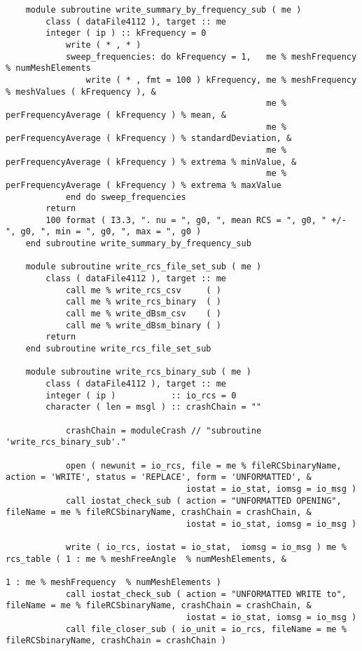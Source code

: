 {{\begin{lstlisting}
    module subroutine write_summary_by_frequency_sub ( me )
        class ( dataFile4112 ), target :: me
        integer ( ip ) :: kFrequency = 0
            write ( * , * )
            sweep_frequencies: do kFrequency = 1,   me % meshFrequency % numMeshElements
                write ( * , fmt = 100 ) kFrequency, me % meshFrequency % meshValues ( kFrequency ), &
                                                    me % perFrequencyAverage ( kFrequency ) % mean, &
                                                    me % perFrequencyAverage ( kFrequency ) % standardDeviation, &
                                                    me % perFrequencyAverage ( kFrequency ) % extrema % minValue, &
                                                    me % perFrequencyAverage ( kFrequency ) % extrema % maxValue
            end do sweep_frequencies
        return
        100 format ( I3.3, ". nu = ", g0, ", mean RCS = ", g0, " +/- ", g0, ", min = ", g0, ", max = ", g0 )
    end subroutine write_summary_by_frequency_sub

    module subroutine write_rcs_file_set_sub ( me )
        class ( dataFile4112 ), target :: me
            call me % write_rcs_csv     ( )
            call me % write_rcs_binary  ( )
            call me % write_dBsm_csv    ( )
            call me % write_dBsm_binary ( )
        return
    end subroutine write_rcs_file_set_sub

    module subroutine write_rcs_binary_sub ( me )
        class ( dataFile4112 ), target :: me
        integer ( ip )           :: io_rcs = 0
        character ( len = msgl ) :: crashChain = ""

            crashChain = moduleCrash // "subroutine 'write_rcs_binary_sub'."

            open ( newunit = io_rcs, file = me % fileRCSbinaryName, action = 'WRITE', status = 'REPLACE', form = 'UNFORMATTED', &
                                    iostat = io_stat, iomsg = io_msg )
            call iostat_check_sub ( action = "UNFORMATTED OPENING", fileName = me % fileRCSbinaryName, crashChain = crashChain, &
                                    iostat = io_stat, iomsg = io_msg )

            write ( io_rcs, iostat = io_stat,  iomsg = io_msg ) me % rcs_table ( 1 : me % meshFreeAngle  % numMeshElements, &
                                                                                 1 : me % meshFrequency  % numMeshElements )
            call iostat_check_sub ( action = "UNFORMATTED WRITE to", fileName = me % fileRCSbinaryName, crashChain = crashChain, &
                                    iostat = io_stat, iomsg = io_msg )
            call file_closer_sub ( io_unit = io_rcs, fileName = me % fileRCSbinaryName, crashChain = crashChain )


\end{lstlisting}}}

